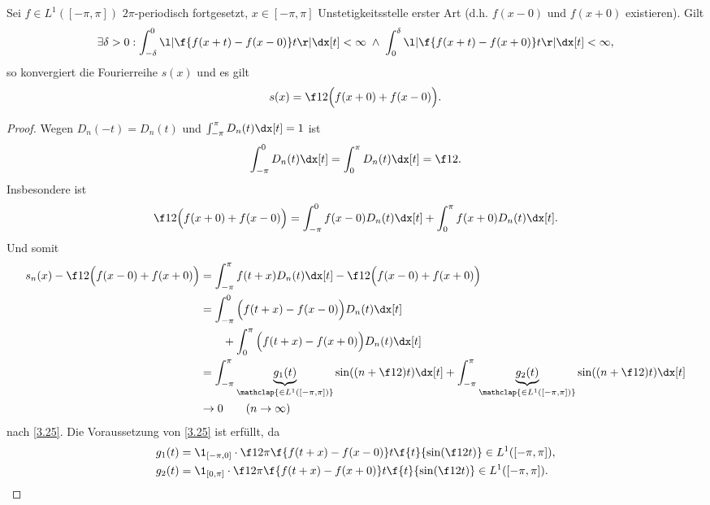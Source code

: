 \begin{st} \label{3.29}
	Sei $f \in L^1([-\pi,\pi])$ $2\pi$-periodisch fortgesetzt, $x \in [-\pi,\pi]$ Unstetigkeitsstelle erster Art (d.h. $f(x-0)$ und $f(x+0)$ existieren).
	Gilt
	\[
		\exists \delta > 0 :
		\int_{-\delta}^0 \l| \f{f(x+t)-f(x-0)}t \r| \dx[t] < \infty
		\;\land\; \int_{0}^{\delta} \l| \f{f(x+t)-f(x+0)}t \r| \dx[t] < \infty,
	\]
	so konvergiert die Fourierreihe $s(x)$ und es gilt
	\[
		s(x) = \f 12 \Big( f(x+0) + f(x-0) \Big).
	\]
	\begin{proof}
		Wegen $D_n(-t) = D_n(t)$ und $\int_{-\pi}^\pi D_n(t) \dx[t] = 1$ ist
		\[
			\int_{-\pi}^0 D_n(t) \dx[t] = \int_0^\pi D_n(t) \dx[t] = \f 12.
		\]
		Insbesondere ist
		\[
			\f 12 \Big(f(x+0) + f(x-0) \Big) = \int_{-\pi}^0 f(x-0) D_n(t) \dx[t] + \int_{0}^\pi f(x+0) D_n(t) \dx[t].
		\]
		Und somit
		\begin{align*}
			s_n(x) - \f 12 \Big( f(x-0) + f(x+0)\Big)
			&= \int_{-\pi}^\pi f(t+x) D_n(t) \dx[t] - \f 12 \Big( f(x-0) + f(x+0)\Big) \\
			&= \int_{-\pi}^0 \Big( f(t+x) - f(x-0) \Big) D_n(t) \dx[t] \\
				&\qquad+ \int_{0}^\pi \Big( f(t+x) - f(x+0) \Big) D_n(t) \dx[t] \\
			&= \int_{-\pi}^\pi \underbrace{g_1(t)}_{\mathclap{\in L^1([-\pi,\pi])}} \sin((n+\f 12)t) \dx[t]
			+ \int_{-\pi}^\pi \underbrace{g_2(t)}_{\mathclap{\in L^1([-\pi,\pi])}} \sin((n+\f 12)t) \dx[t] \\
			&\to 0 \qquad (n\to \infty)
		\end{align*}
		nach \ref{3.25}. Die Voraussetzung von \ref{3.25} ist erfüllt, da
		\begin{align*}
			g_1(t) &= \1_{[-\pi,0]} \cdot \f 1{2\pi} \f {f(t+x) - f(x-0)}t  \f {t}{\sin (\f 12 t)} \in L^1([-\pi,\pi]), \\
			g_2(t) &= \1_{[0,\pi]} \cdot \f 1{2\pi} \f {f(t+x) - f(x+0)}t  \f {t}{\sin (\f 12 t)} \in L^1([-\pi,\pi]).
		\end{align*}

	\end{proof}
\end{st}

